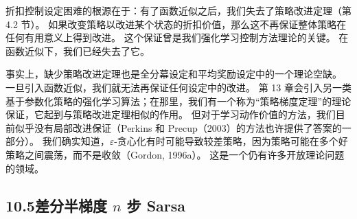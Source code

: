 \documentclass[UTF8, 12pt, fontset=fandol, oneside]{ctexart}
\begin{document}
\begin{center}
\end{center}

折扣控制设定困难的根源在于：有了函数近似之后，我们失去了策略改进定理（第 4.2 节）。
如果改变策略以改进某个状态的折扣价值，那么这不再保证整体策略在任何有用意义上得到改进。
这个保证曾是我们强化学习控制方法理论的关键。
在函数近似下，我们已经失去了它。

事实上，缺少策略改进定理也是全分幕设定和平均奖励设定中的一个理论空缺。
一旦引入函数近似，我们就无法再保证任何设定中的改进。
第 13 章会引入另一类基于参数化策略的强化学习算法；在那里，我们有一个称为“策略梯度定理”的理论保证，它起到与策略改进定理相似的作用。
但对于学习动作价值的方法，我们目前似乎没有局部改进保证（Perkins 和 Precup（2003）的方法也许提供了答案的一部分）。
我们确实知道，$\varepsilon$-贪心化有时可能导致较差策略，因为策略可能在多个好策略之间震荡，而不是收敛（Gordon, 1996a）。
这是一个仍有许多开放理论问题的领域。

\subsection*{10.5\quad 差分半梯度 $n$ 步 Sarsa}
\end{document}

